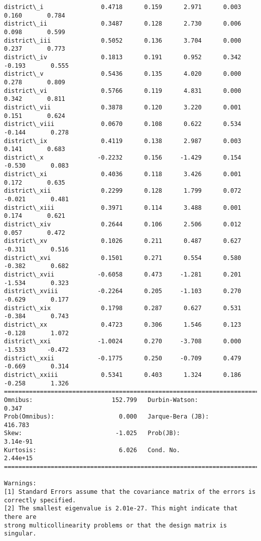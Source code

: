 \documentclass[11pt]{article}
\begin{document}
\begin{Verbatim}[commandchars=\\\{\}]
district\_i                0.4718      0.159      2.971      0.003       0.160       0.784
district\_ii               0.3487      0.128      2.730      0.006       0.098       0.599
district\_iii              0.5052      0.136      3.704      0.000       0.237       0.773
district\_iv               0.1813      0.191      0.952      0.342      -0.193       0.555
district\_v                0.5436      0.135      4.020      0.000       0.278       0.809
district\_vi               0.5766      0.119      4.831      0.000       0.342       0.811
district\_vii              0.3878      0.120      3.220      0.001       0.151       0.624
district\_viii             0.0670      0.108      0.622      0.534      -0.144       0.278
district\_ix               0.4119      0.138      2.987      0.003       0.141       0.683
district\_x               -0.2232      0.156     -1.429      0.154      -0.530       0.083
district\_xi               0.4036      0.118      3.426      0.001       0.172       0.635
district\_xii              0.2299      0.128      1.799      0.072      -0.021       0.481
district\_xiii             0.3971      0.114      3.488      0.001       0.174       0.621
district\_xiv              0.2644      0.106      2.506      0.012       0.057       0.472
district\_xv               0.1026      0.211      0.487      0.627      -0.311       0.516
district\_xvi              0.1501      0.271      0.554      0.580      -0.382       0.682
district\_xvii            -0.6058      0.473     -1.281      0.201      -1.534       0.323
district\_xviii           -0.2264      0.205     -1.103      0.270      -0.629       0.177
district\_xix              0.1798      0.287      0.627      0.531      -0.384       0.743
district\_xx               0.4723      0.306      1.546      0.123      -0.128       1.072
district\_xxi             -1.0024      0.270     -3.708      0.000      -1.533      -0.472
district\_xxii            -0.1775      0.250     -0.709      0.479      -0.669       0.314
district\_xxiii            0.5341      0.403      1.324      0.186      -0.258       1.326
==============================================================================
Omnibus:                      152.799   Durbin-Watson:                   0.347
Prob(Omnibus):                  0.000   Jarque-Bera (JB):              416.783
Skew:                          -1.025   Prob(JB):                     3.14e-91
Kurtosis:                       6.026   Cond. No.                     2.44e+15
==============================================================================

Warnings:
[1] Standard Errors assume that the covariance matrix of the errors is correctly specified.
[2] The smallest eigenvalue is 2.01e-27. This might indicate that there are
strong multicollinearity problems or that the design matrix is singular.

    \end{Verbatim}
\end{document}
